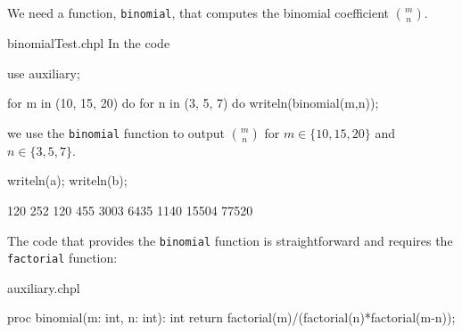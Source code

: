 We need a function, \lstinline{binomial}, that computes the binomial coefficient $\binom{m}{n}$.
\begin{chapelexample}{binomialTest.chpl}
In the code
\begin{chapelpre}
use auxiliary;
\end{chapelpre}
\begin{chapel}
for m in (10, 15, 20) do {
  for n in (3, 5, 7) do {
    writeln(binomial(m,n));
  }
}
\end{chapel}
we use the \lstinline{binomial} function to output $\binom{m}{n}$ 
for $m\in\{10, 15, 20\}$ and $n \in \{3, 5, 7\}$.
\begin{chapelpost}
writeln(a);
writeln(b);
\end{chapelpost}
\begin{chapeloutput}
120
252
120
455
3003
6435
1140
15504
77520
\end{chapeloutput}
\end{chapelexample}

The code that provides the \lstinline{binomial} function is straightforward 
and requires the \lstinline{factorial} function:
\begin{chapelsource}{auxiliary.chpl}
\begin{chapel}
proc binomial(m: int, n: int): int {
  return factorial(m)/(factorial(n)*factorial(m-n));
}
\end{chapel}
\end{chapelsource}


